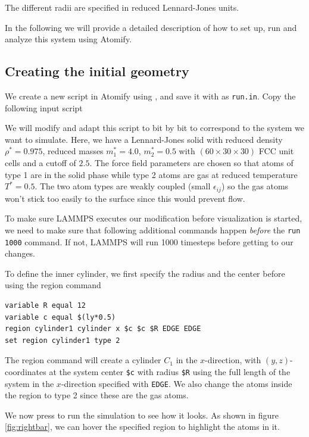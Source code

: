 \documentclass[12pt,a4paper,final]{iopart}
\newcommand{\code}[1]{\colorbox{light-gray}{\color{RawSienna}\texttt{#1}}}
\begin{document}
The different radii are specified in reduced Lennard-Jones units.

In the following we will provide a detailed description of how to set up, run and analyze this system using Atomify.

\subsection{Creating the initial geometry}
We create a new script in Atomify using , and save it with  as \code{run.in}.
Copy the following input script



We will modify and adapt this script to bit by bit to correspond to the system we want to simulate.
Here, we have a Lennard-Jones solid with reduced density
$\rho^* = 0.975$, reduced masses $m_1^* = 4.0$, $m_2^* = 0.5$ with $(60\times30\times30)$
FCC unit cells and a cutoff of $2.5$. 
The force field parameters are chosen so that atoms of type 1
are in the solid phase while type 2 atoms are gas at reduced temperature $T^*=0.5$.
The two atom types are weakly coupled (small $\epsilon_{ij}$) so the gas atoms won't
stick too easily to the surface since this would prevent flow.

To make sure LAMMPS executes our modification before visualization is started,
we need to make sure that following additional commands happen \textit{before} the \code{run 1000} command.
If not, LAMMPS will run 1000 timesteps before getting to our changes.

To define the inner cylinder, we first specify the radius and the center before using the region command
\begin{lstlisting}
variable R equal 12
variable c equal $(ly*0.5)
region cylinder1 cylinder x $c $c $R EDGE EDGE
set region cylinder1 type 2
\end{lstlisting}
The region command will create a cylinder $C_1$ in the $x$-direction, with $(y,z)$-coordinates at the 
system center \code{\$c} with radius \code{\$R} using the full length of the system in the $x$-direction specified with \code{EDGE}.
We also change the atoms inside the region to type 2 since these are the gas atoms.

We now press  to run the simulation to see how it looks.
As shown in figure \ref{fig:rightbar}, we can hover the specified region to highlight the atoms in it.
\end{document}
